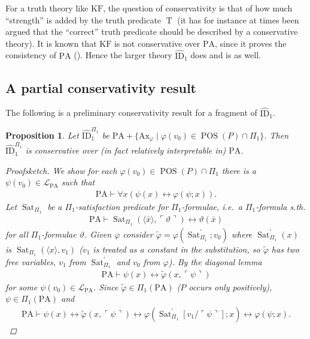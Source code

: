 \documentclass{scrartcl}
\theoremstyle{definition}
\theoremstyle{plain}
\newtheorem{Prp}{Proposition}
\theoremstyle{remark}
\DeclareMathOperator{\T}{T}
\newcommand{\liff}{\leftrightarrow}
\renewcommand{\=}{=\!\!\!=}
\newcommand{\GN}[1]{\ensuremath{\ulcorner #1 \urcorner}}
\newcommand{\sep}{\; | \;}
\newcommand{\PA}{\ensuremath{\mathrm{PA}}}
\renewcommand{\L}{\ensuremath{\mathcal{L}}}
\DeclareMathOperator{\Sat}{Sat}
\DeclareMathOperator{\POS}{POS}
\newcommand{\ID}[2][]{\ensuremath{\widehat{\mathrm{ID}}_{#2}^{#1}}}
\newcommand{\KF}{\ensuremath{\mathrm{KF}}}
\newcommand{\Ax}{\ensuremath{\mathrm{Ax}}}
\begin{document}
For a truth theory like $\KF$, the question of conservativity is that of how much ``strength'' is added by the truth predicate $\T$ (it has for instance at times been argued that the ``correct'' truth predicate should be described by a conservative theory). It is known that $\KF$ is not conservative over $\PA$, since it proves the consistency of $\PA$ (\cite[pp.~106, 159 \& 217]{Halbach:2011}). Hence the larger theory $\ID1$ does and is as well.

\subsection{A partial conservativity result}
\label{sec:partial}

The following is a preliminary conservativity result for a fragment of $\ID1$.

\begin{Prp}\label{prp:clc}
  Let $\ID[\Pi_1]1$ be  $\PA + \{\Ax_{\varphi} \sep \varphi(v_0) \in \POS(P) \cap \Pi_1\}$. Then $\ID[\Pi_1]1$ is conservative over (in fact relatively interpretable in) $\PA$.
  \begin{proof}[Proofsketch]
    We show for each $\varphi(v_0) \in \POS(P) \cap \Pi_1$ there is a $\psi(v_0) \in \L_{\PA}$ such that
    \begin{align*}
      \PA \vdash \forall x (\psi(x) \liff \varphi(\psi;x))\text{.}
    \end{align*}
    Let $\Sat_{\Pi_1}$ be a $\Pi_1$-satisfaction predicate for $\Pi_1$-formulae, i.e.~a $\Pi_1$-formula s.th.
    \begin{align*}
      \PA \vdash \Sat_{\Pi_1}(\langle \bar{x} \rangle, \GN{\vartheta}) \liff \vartheta(\bar{x})
    \end{align*}
    for all $\Pi_1$-formulae $\vartheta$. Given $\varphi$ consider $\tilde{\varphi} = \varphi(\Sat_{\Pi_1}^{\prime};v_0)$ where $\Sat_{\Pi_1}^{\prime}(x)$ is $\Sat_{\Pi_1}(\langle x \rangle,v_1)$ ($v_1$ is treated as a constant in the substitution, so $\tilde{\varphi}$ has two free variables, $v_1$ from $\Sat_{\Pi_1}^{\prime}$ and $v_0$ from $\varphi$). By the diagonal lemma
    \begin{align*}
      \PA \vdash \psi(x) \liff \tilde{\varphi}(x,\GN{\psi})
    \end{align*}
    for some $\psi(v_0) \in \L_{\PA}$. Since $\tilde{\varphi} \in \Pi_1(\PA)$ ($P$ occurs only positively), $\psi \in \Pi_1(\PA)$ and
    \begin{align*}
      \PA \vdash \psi(x) \liff \tilde{\varphi}(x,\GN{\psi}) \liff \varphi(\Sat_{\Pi_1}^{\prime}[v_1/\GN{\psi}];x) \liff \varphi(\psi;x)\text{.}
    \end{align*}
  \end{proof}
\end{Prp}
\end{document}
